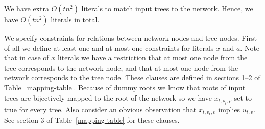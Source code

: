 \documentclass[runningheads, envcountsame, a4paper]{llncs}
\begin{document}
We have extra $O(tn^2)$ literals to match input trees to the network. Hence, we have $O(tn^2)$ literals in total.

We specify constraints for relations between network nodes and tree nodes. 
First of all we define at-least-one and at-most-one constraints for literals $x$ and $a$. Note that in case 
of $x$ literals we have a restriction that at most one node from the tree corresponds to the network node, and that at 
most one node from the network corresponds to the tree node. These clauses are defined in sections 1--2 of Table~\ref{mapping-table}.
Because of dummy roots we know that roots of input trees 
are bijectively mapped to the root of the network so we have $x_{t,\rho_t,\rho}$ set to true for every tree. Also 
consider an obvious observation that $x_{t,v_t,v}$ implies $u_{t,v}$. See section 3 of Table~\ref{mapping-table} for these clauses.
\end{document}
